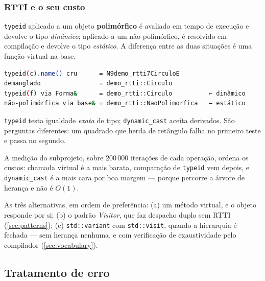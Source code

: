 \subsubsection{RTTI e o seu custo}
\label{sec:oop-rtti}

\texttt{typeid} aplicado a um objeto \textbf{polimórfico} é avaliado em tempo de
execução e devolve o tipo \emph{dinâmico}; aplicado a um não polimórfico, é
resolvido em compilação e devolve o tipo \emph{estático}. A diferença entre as
duas situações é uma função virtual na base.

\begin{lstlisting}[style=bt, language=bash,
    caption={Saída de \texttt{src/oop/}: o nome cru vem no formato do
             Itanium ABI~\cite{itaniumabi} e precisa de
             \texttt{abi::\_\_cxa\_demangle}.}]
typeid(c).name() cru      = N9demo_rtti7CirculoE
demanglado                = demo_rtti::Circulo
typeid(f) via Forma&      = demo_rtti::Circulo          ← dinâmico
não-polimórfica via base& = demo_rtti::NaoPolimorfica   ← estático
\end{lstlisting}

\texttt{typeid} testa igualdade \emph{exata} de tipo; \texttt{dynamic\_cast}
aceita derivados. São perguntas diferentes: um quadrado que herda de retângulo
falha no primeiro teste e passa no segundo.

A medição do subprojeto, sobre 200\,000 iterações de cada operação, ordena os
custos: chamada virtual é a mais barata, comparação de \texttt{typeid} vem
depois, e \texttt{dynamic\_cast} é a mais cara por boa margem --- porque
percorre a árvore de herança e não é $O(1)$.

\begin{regra}
As três alternativas, em ordem de preferência: (a) um método virtual, e o objeto
responde por si; (b) o padrão \emph{Visitor}, que faz despacho duplo sem RTTI
(\cref{sec:patterns}); (c) \texttt{std::variant} com \texttt{std::visit}, quando
a hierarquia é fechada --- sem herança nenhuma, e com verificação de
exaustividade pelo compilador (\cref{sec:vocabulary}).
\end{regra}

\subsection{Tratamento de erro}
\label{sec:errors}

